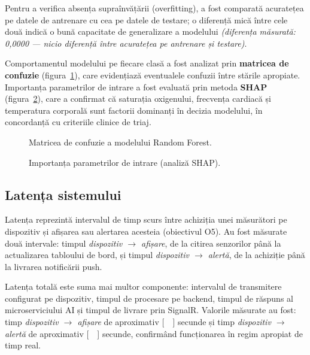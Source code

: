 Pentru a verifica absența supraînvățării (overfitting), a fost comparată acuratețea pe datele de antrenare cu cea pe datele de testare; o diferență mică între cele două indică o bună capacitate de generalizare a modelului \textit{(diferența măsurată: 0,0000 — nicio diferență între acuratețea pe antrenare și testare)}.

Comportamentul modelului pe fiecare clasă a fost analizat prin \textbf{matricea de confuzie} (figura~\ref{fig:confuzie}), care evidențiază eventualele confuzii între stările apropiate. Importanța parametrilor de intrare a fost evaluată prin metoda \textbf{SHAP} (figura~\ref{fig:shap}), care a confirmat că saturația oxigenului, frecvența cardiacă și temperatura corporală sunt factorii dominanți în decizia modelului, în concordanță cu criteriile clinice de triaj.

\begin{figure}[H]
\centering
{}
\caption{Matricea de confuzie a modelului Random Forest.}
\label{fig:confuzie}
\end{figure}

\begin{figure}[H]
\centering
{}
\caption{Importanța parametrilor de intrare (analiză SHAP).}
\label{fig:shap}
\end{figure}

\subsection{Latența sistemului}

Latența reprezintă intervalul de timp scurs între achiziția unei măsurători pe dispozitiv și afișarea sau alertarea acesteia (obiectivul O5). Au fost măsurate două intervale: timpul \textit{dispozitiv $\rightarrow$ afișare}, de la citirea senzorilor până la actualizarea tabloului de bord, și timpul \textit{dispozitiv $\rightarrow$ alertă}, de la achiziție până la livrarea notificării push.

Latența totală este suma mai multor componente: intervalul de transmitere configurat pe dispozitiv, timpul de procesare pe backend, timpul de răspuns al microserviciului AI și timpul de livrare prin SignalR. Valorile măsurate au fost: timp \textit{dispozitiv $\rightarrow$ afișare} de aproximativ [\ \ ] secunde și timp \textit{dispozitiv $\rightarrow$ alertă} de aproximativ [\ \ ] secunde, confirmând funcționarea în regim apropiat de timp real.

